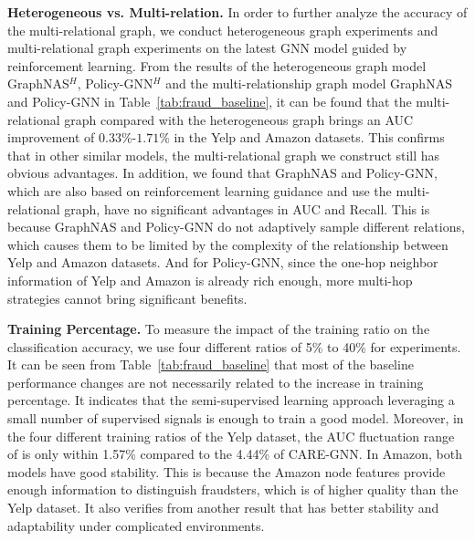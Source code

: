 \textbf{Heterogeneous vs. Multi-relation. }
In order to further analyze the accuracy of the multi-relational graph, we conduct heterogeneous graph experiments and multi-relational graph experiments on the latest GNN model guided by reinforcement learning. 
From the results of the heterogeneous graph model GraphNAS$^{H}$, Policy-GNN$^{H}$ and the multi-relationship graph model GraphNAS and Policy-GNN in Table~\ref{tab:fraud_baseline}, it can be found that the multi-relational graph compared with the heterogeneous graph brings an AUC improvement of $0.33\%$-$1.71\%$ in the Yelp and Amazon datasets. 
This confirms that in other similar models, the multi-relational graph we construct still has obvious advantages. 
In addition, we found that GraphNAS and Policy-GNN, which are also based on reinforcement learning guidance and use the multi-relational graph, have no significant advantages in AUC and Recall. 
This is because GraphNAS and Policy-GNN do not adaptively sample different relations, which causes them to be limited by the complexity of the relationship between Yelp and Amazon datasets. 
And for Policy-GNN, since the one-hop neighbor information of Yelp and Amazon is already rich enough, more multi-hop strategies cannot bring significant benefits. 


\textbf{Training Percentage. }
To measure the impact of the training ratio on the classification accuracy, we use four different ratios of 5\% to 40\% for experiments.
It can be seen from Table~\ref{tab:fraud_baseline} that most of the baseline performance changes are not necessarily related to the increase in training percentage.
It indicates that the semi-supervised learning approach leveraging a small number of supervised signals is enough to train a good model.
Moreover, in the four different training ratios of the Yelp dataset, the AUC fluctuation range of \RioGNN is only within 1.57\% compared to the 4.44\% of CARE-GNN.
In Amazon, both models have good stability.
This is because the Amazon node features provide enough information to distinguish fraudsters, which is of higher quality than the Yelp dataset.
It also verifies from another result that \RioGNN has better stability and adaptability under complicated environments.




